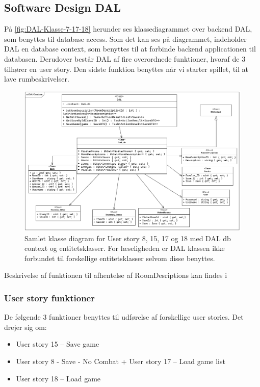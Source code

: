 \subsection{Software Design DAL}
På \autoref{fig:DAL-Klasse-7-17-18} herunder ses klassediagrammet over backend DAL, som benyttes til database access. 
Som det kan ses på diagrammet, indeholder DAL en database context, som benyttes til at forbinde backend applicationen til databasen. 
Derudover består DAL af fire overordnede funktioner, hvoraf de 3 tilhører en user story. 
Den sidste funktion benyttes når vi starter spillet, til at lave rumbeskrivelser.\\

\begin{figure}[H]
\centering
\includegraphics[width = \textwidth]{02-Body/Images/DAL-Database/DAL-DB-CD.PNG}
\caption{Samlet klasse diagram for User story 8, 15, 17 og 18 med DAL db context og entitetsklasser.
For læseligheden er DAL klassen ikke forbundet til forskellige entitetsklasser selvom disse benyttes.}
\label{fig:DAL-Klasse-7-17-18}
\end{figure}

Beskrivelse af funktionen til afhentelse af RoomDesriptions kan findes i \parencite[Section 10.6][]{TekniskBilag}

\subsubsection{User story funktioner}
De følgende 3 funktioner benyttes til udførelse af forskellige user stories.
Det drejer sig om:
\begin{itemize}
\item User story 15 – Save game
\item User story 8 - Save - No Combat  + User story 17 – Load game list 
\item User story 18 – Load game \\
\end{itemize}

